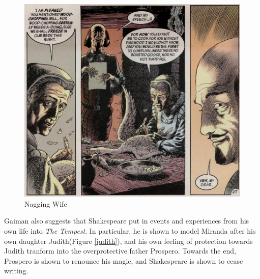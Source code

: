 \documentclass{article}
\begin{document}
\begin{figure}[htp]
  \begin{center}
    \centering
    \includegraphics[scale=0.4]{../Presentation/nagging.jpg}
  \end{center}
  \caption{Nagging Wife}
  \label{nag}
\end{figure}

Gaiman also suggests that Shakespeare put in events and experiences from his own life into \emph{The Tempest}. In particular, he is shown to model Miranda after his own daughter Judith(Figure \ref{judith}), and his own feeling of protection towards Judith tranform into the overprotective father Prospero. Towards the end, Prospero is shown to renounce his magic, and Shakespeare is shown to cease writing. 
\end{document}
